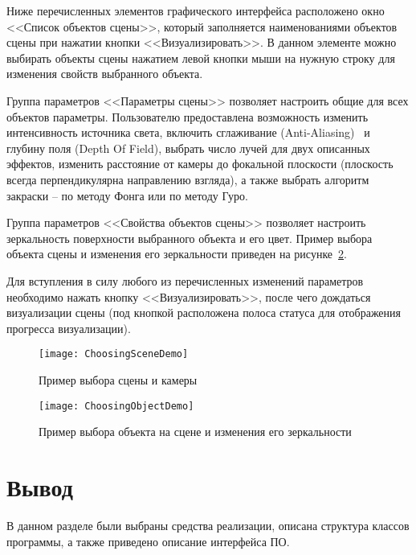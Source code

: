 Ниже перечисленных элементов графического интерфейса расположено окно <<Список объектов сцены>>, который заполняется наименованиями объектов сцены при нажатии кнопки <<Визуализировать>>. В данном элементе можно выбирать объекты сцены нажатием левой кнопки мыши на нужную строку для изменения свойств выбранного объекта.

Группа параметров <<Параметры сцены>> позволяет настроить общие для всех объектов параметры. Пользователю предоставлена возможность изменить интенсивность источника света, включить сглаживание (Anti-Aliasing)~\cite{Anti-aliasing} и глубину поля (Depth Of Field), выбрать число лучей для двух описанных эффектов, изменить расстояние от камеры до фокальной плоскости (плоскость всегда перпендикулярна направлению взгляда), а также выбрать алгоритм закраски -- по методу Фонга или по методу Гуро.

Группа параметров <<Свойства объектов сцены>> позволяет настроить зеркальность поверхности выбранного объекта и его цвет. Пример выбора объекта сцены и изменения его зеркальности приведен на рисунке~\ref{fig:ChoosingObjectDemo}.

Для вступления в силу любого из перечисленных изменений параметров необходимо нажать кнопку <<Визуализировать>>, после чего дождаться визуализации сцены (под кнопкой расположена полоса статуса для отображения прогресса визуализации).

\begin{figure}[H]
	\centering
	\texttt{[image: ChoosingSceneDemo]}
	\caption{Пример выбора сцены и камеры}
	\label{fig:ChoosingSceneDemo}
\end{figure}

\begin{figure}[H]
	\centering
	\texttt{[image: ChoosingObjectDemo]}
	\caption{Пример выбора объекта на сцене и изменения его зеркальности}
	\label{fig:ChoosingObjectDemo}
\end{figure}

\section*{Вывод}
В данном разделе были выбраны средства реализации, описана структура классов программы, а также приведено описание интерфейса ПО.

\clearpage
